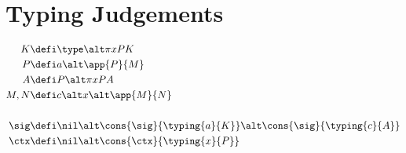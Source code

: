 \documentclass[12pt]{article}
\begin{document}
\section*{Typing Judgements}

\begin{align*}
  K &\defi \type \alt \pi{x}{P}{K} \\
  P &\defi a \alt \app{P}{M} \\
  A &\defi P \alt \pi{x}{P}{A} \\
  M, N &\defi c \alt x \alt \app{M}{N} \\
  \\
  \sig &\defi \nil \alt \cons{\sig}{\typing{a}{K}} \alt \cons{\sig}{\typing{c}{A}} \\
  \ctx &\defi \nil \alt \cons{\ctx}{\typing{x}{P}}
\end{align*}

{ %
\vspace{0.5cm}
\noindent {}

\begin{prooftree}
\end{prooftree}

\begin{prooftree}
\end{prooftree}

\begin{prooftree}
\end{prooftree}

\vspace{0.5cm}
}

{ %
\vspace{0.5cm}
\noindent {}

\begin{prooftree}
\end{prooftree}

\begin{prooftree}
\end{prooftree}

\vspace{0.5cm}
}
\end{document}
